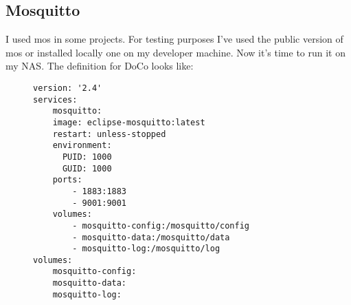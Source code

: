 

\subsection{Mosquitto}

I used \gls{mos} in some projects. For testing purposes I've used the public
version of \gls{mos} or installed locally one on my developer machine. Now
it's time to run it on my \gls{NAS}. The definition for \gls{DoCo} looks like:

\begin{figure}[H]
    \scriptsize
    \centering
    \begin{BVerbatim}
version: '2.4'
services:
    mosquitto:
    image: eclipse-mosquitto:latest
    restart: unless-stopped
    environment:
      PUID: 1000
      GUID: 1000
    ports:
        - 1883:1883
        - 9001:9001
    volumes:
        - mosquitto-config:/mosquitto/config
        - mosquitto-data:/mosquitto/data
        - mosquitto-log:/mosquitto/log
volumes:
    mosquitto-config:
    mosquitto-data:
    mosquitto-log:
    \end{BVerbatim}
\end{figure}
